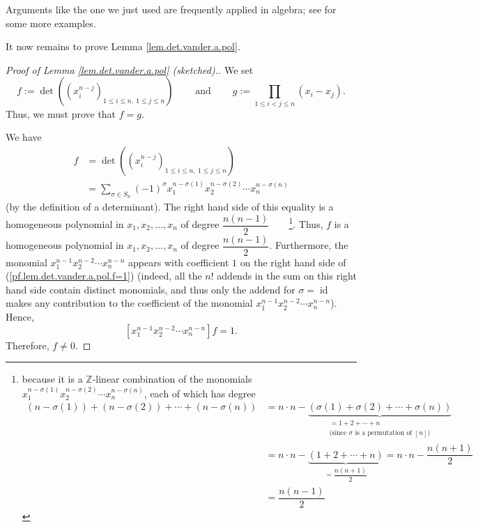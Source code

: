 Arguments like the one we just used are frequently applied in algebra; see
\cite{Conrad-ui} for some more examples.

It now remains to prove Lemma \ref{lem.det.vander.a.pol}.

\begin{proof}
[Proof of Lemma \ref{lem.det.vander.a.pol} (sketched).]We set%
\[
f:=\det\left(  \left(  x_{i}^{n-j}\right)  _{1\leq i\leq n,\ 1\leq j\leq
n}\right)  \ \ \ \ \ \ \ \ \ \ \text{and}\ \ \ \ \ \ \ \ \ \ g:=\prod_{1\leq
i<j\leq n}\left(  x_{i}-x_{j}\right)  .
\]
Thus, we must prove that $f=g$.

We have%
\begin{align}
f  &  =\det\left(  \left(  x_{i}^{n-j}\right)  _{1\leq i\leq n,\ 1\leq j\leq
n}\right) \nonumber\\
&  =\sum_{\sigma\in S_{n}}\left(  -1\right)  ^{\sigma}x_{1}^{n-\sigma\left(
1\right)  }x_{2}^{n-\sigma\left(  2\right)  }\cdots x_{n}^{n-\sigma\left(
n\right)  } \label{pf.lem.det.vander.a.pol.f=1}%
\end{align}
(by the definition of a determinant). The right hand side of this equality is
a homogeneous polynomial in $x_{1},x_{2},\ldots,x_{n}$ of degree
$\dfrac{n\left(  n-1\right)  }{2}$\ \ \ \ \footnote{because it is a
$\mathbb{Z}$-linear combination of the monomials $x_{1}^{n-\sigma\left(
1\right)  }x_{2}^{n-\sigma\left(  2\right)  }\cdots x_{n}^{n-\sigma\left(
n\right)  }$, each of which has degree%
\begin{align*}
\left(  n-\sigma\left(  1\right)  \right)  +\left(  n-\sigma\left(  2\right)
\right)  +\cdots+\left(  n-\sigma\left(  n\right)  \right)   &  =n\cdot
n-\underbrace{\left(  \sigma\left(  1\right)  +\sigma\left(  2\right)
+\cdots+\sigma\left(  n\right)  \right)  }_{\substack{=1+2+\cdots
+n\\\text{(since }\sigma\text{ is a permutation of }\left[  n\right]
\text{)}}}\\
&  =n\cdot n-\underbrace{\left(  1+2+\cdots+n\right)  }_{=\dfrac{n\left(
n+1\right)  }{2}}=n\cdot n-\dfrac{n\left(  n+1\right)  }{2}\\
&  =\dfrac{n\left(  n-1\right)  }{2}%
\end{align*}
}. Thus, $f$ is a homogeneous polynomial in $x_{1},x_{2},\ldots,x_{n}$ of
degree $\dfrac{n\left(  n-1\right)  }{2}$. Furthermore, the monomial
$x_{1}^{n-1}x_{2}^{n-2}\cdots x_{n}^{n-n}$ appears with coefficient $1$ on the
right hand side of (\ref{pf.lem.det.vander.a.pol.f=1}) (indeed, all the $n!$
addends in the sum on this right hand side contain distinct monomials, and
thus only the addend for $\sigma=\operatorname*{id}$ makes any contribution to
the coefficient of the monomial $x_{1}^{n-1}x_{2}^{n-2}\cdots x_{n}^{n-n}$).
Hence,%
\begin{equation}
\left[  x_{1}^{n-1}x_{2}^{n-2}\cdots x_{n}^{n-n}\right]  f=1.
\label{pf.lem.det.vander.a.pol.f-LC}%
\end{equation}
Therefore, $f\neq0$.


\end{proof}
